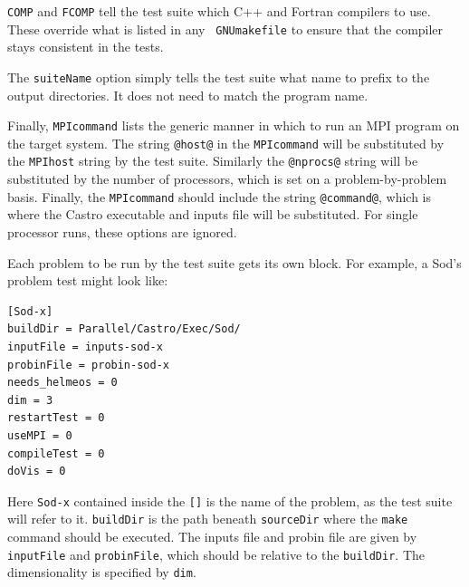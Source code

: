 {\tt COMP} and {\tt FCOMP} tell the test suite which C++ and Fortran
compilers to use.  These override what is listed in any {\tt
  GNUmakefile} to ensure that the compiler stays consistent in the
tests.

The {\tt suiteName} option simply tells the test suite what name to
prefix to the output directories.  It does not need to match the
program name.  

Finally, {\tt MPIcommand} lists the generic manner in which to run an
MPI program on the target system.  The string {\tt @host@} in the
{\tt MPIcommand} will be substituted by the {\tt MPIhost} string by
the test suite.  Similarly the {\tt @nprocs@} string will be
substituted by the number of processors, which is set on a
problem-by-problem basis.  Finally, the {\tt MPIcommand} should
include the string {\tt @command@}, which is where the Castro
executable and inputs file will be substituted.  For single processor
runs, these options are ignored.

Each problem to be run by the test suite gets its own block.  For
example, a Sod's problem test might look like:

\begin{verbatim}
[Sod-x]
buildDir = Parallel/Castro/Exec/Sod/
inputFile = inputs-sod-x
probinFile = probin-sod-x
needs_helmeos = 0
dim = 3
restartTest = 0
useMPI = 0
compileTest = 0
doVis = 0
\end{verbatim}

Here {\tt Sod-x} contained inside the {\tt []} is the name of the problem, as the 
test suite will refer to it.  {\tt buildDir} is the path beneath {\tt sourceDir} 
where the {\tt make} command should be executed.  The inputs file and probin file
are given by {\tt inputFile} and {\tt probinFile}, which should be relative
to the {\tt buildDir}.  The dimensionality is specified by {\tt dim}.

